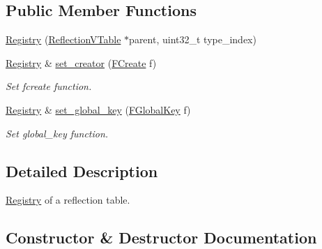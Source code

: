 \subsection*{Public Member Functions}
\begin{DoxyCompactItemize}
\item 
\hyperlink{classtvm_1_1ReflectionVTable_1_1Registry_ac8f4637640aa9dffed745303a4cfa827}{Registry} (\hyperlink{classtvm_1_1ReflectionVTable}{Reflection\+V\+Table} $\ast$parent, uint32\+\_\+t type\+\_\+index)
\item 
\hyperlink{classtvm_1_1ReflectionVTable_1_1Registry}{Registry} \& \hyperlink{classtvm_1_1ReflectionVTable_1_1Registry_a33948eae2c61e1c80c637f08b516594a}{set\+\_\+creator} (\hyperlink{classtvm_1_1ReflectionVTable_adf61fde4dfac8d1cb59159db6722b335}{F\+Create} f)
\begin{DoxyCompactList}\small\item\em Set fcreate function. \end{DoxyCompactList}\item 
\hyperlink{classtvm_1_1ReflectionVTable_1_1Registry}{Registry} \& \hyperlink{classtvm_1_1ReflectionVTable_1_1Registry_aaddac64b0405e982a9de37186bb32985}{set\+\_\+global\+\_\+key} (\hyperlink{classtvm_1_1ReflectionVTable_abe09d73c5ea2c51f5cfa30471b8f89ef}{F\+Global\+Key} f)
\begin{DoxyCompactList}\small\item\em Set global\+\_\+key function. \end{DoxyCompactList}\end{DoxyCompactItemize}


\subsection{Detailed Description}
\hyperlink{classtvm_1_1ReflectionVTable_1_1Registry}{Registry} of a reflection table. 

\subsection{Constructor \& Destructor Documentation}
